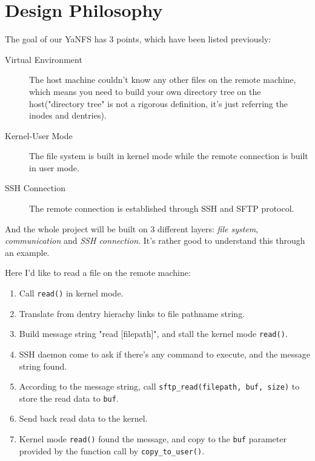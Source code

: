\section {Design Philosophy}

The goal of our YaNFS has 3 points, which have been listed previously:
\begin{description}
\item[Virtual Environment] The host machine couldn't know any other files on the remote machine, which means you need to build your own directory tree on the host("directory tree" is not a rigorous definition, it's just referring the inodes and dentries).
\item[Kernel-User Mode] The file system is built in kernel mode while the remote connection is built in user mode.
\item[SSH Connection] The remote connection is established through SSH and SFTP protocol.
\end{description}

And the whole project will be built on 3 different layers: \emph{file system}, \emph{communication} and \emph{SSH connection}. It's rather good to understand this through an example.

Here I'd like to read a file on the remote machine:
\begin{enumerate}
\item Call \lstinline{read()} in kernel mode.
\item Translate from dentry hierachy links to file pathname string.
\item Build message string "read [filepath]", and stall the kernel mode \lstinline{read()}.
\item SSH daemon come to ask if there's any command to execute, and the message string found.
\item According to the message string, call \lstinline{sftp_read(filepath, buf, size)} to store the read data to \lstinline{buf}.
\item Send back read data to the kernel.
\item Kernel mode \lstinline{read()} found the message, and copy to the \lstinline{buf} parameter provided by the function call by \lstinline{copy_to_user()}.
\end{enumerate}

